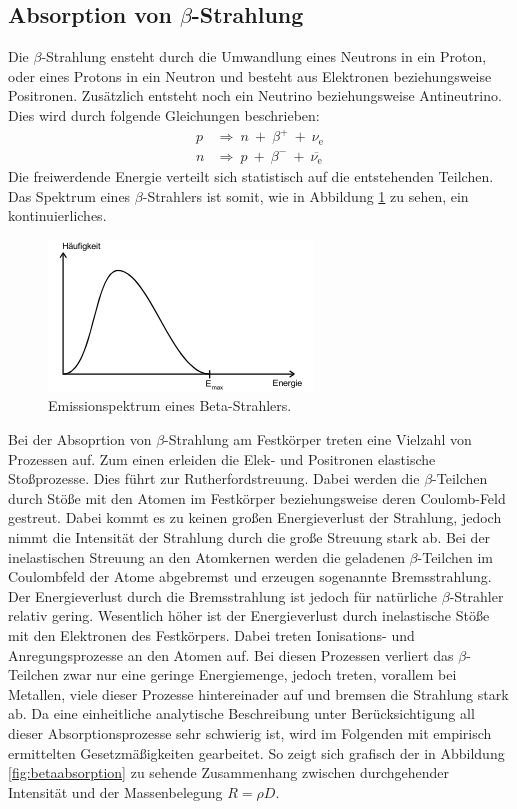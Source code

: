 \subsection{Absorption von \texorpdfstring{$\beta$}{Beta}-Strahlung}
Die $\beta$-Strahlung ensteht durch die Umwandlung eines Neutrons in ein Proton, oder eines Protons in ein Neutron und besteht aus Elektronen beziehungsweise Positronen.
Zusätzlich entsteht noch ein Neutrino beziehungsweise Antineutrino.
Dies wird durch folgende Gleichungen beschrieben:
\begin{align*}
  p & \Rightarrow \: n \: + \: {\beta}^{+} \: + \: \nu_\text{e} \\
  n & \Rightarrow \: p \: + \: {\beta}^{-} \: + \: \overline{\nu_\text{e}}
\end{align*}
Die freiwerdende Energie verteilt sich statistisch auf die entstehenden Teilchen.
Das Spektrum eines $\beta$-Strahlers ist somit, wie in Abbildung \ref{fig:betaspektrum}
zu sehen, ein kontinuierliches.
\begin{figure}
  \centering
  \includegraphics{pictures/betaspektrum.png}
  \caption{Emissionspektrum eines Beta-Strahlers.\cite{sample}}
  \label{fig:betaspektrum}
\end{figure}
Bei der Absoprtion von $\beta$-Strahlung am Festkörper treten eine Vielzahl von Prozessen auf.
Zum einen erleiden die Elek- und Positronen elastische Stoßprozesse. Dies führt zur Rutherfordstreuung.
Dabei werden die $\beta$-Teilchen durch Stöße mit den Atomen im Festkörper beziehungsweise deren Coulomb-Feld gestreut. Dabei kommt es zu keinen großen Energieverlust der Strahlung,
jedoch nimmt die Intensität der Strahlung durch die große Streuung stark ab.
Bei der inelastischen Streuung an den Atomkernen werden die geladenen $\beta$-Teilchen im Coulombfeld der Atome abgebremst und erzeugen sogenannte Bremsstrahlung.
Der Energieverlust durch die Bremsstrahlung ist jedoch für natürliche $\beta$-Strahler relativ gering.
Wesentlich höher ist der Energieverlust durch inelastische Stöße mit den Elektronen des Festkörpers. Dabei treten Ionisations- und Anregungsprozesse an den Atomen auf.
Bei diesen Prozessen verliert das $\beta$-Teilchen zwar nur eine geringe Energiemenge, jedoch treten, vorallem bei Metallen, viele dieser Prozesse hintereinader auf und
bremsen die Strahlung stark ab. Da eine einheitliche analytische Beschreibung unter Berücksichtigung all dieser Absorptionsprozesse sehr schwierig ist, wird im Folgenden
mit empirisch ermittelten Gesetzmäßigkeiten gearbeitet. So zeigt sich grafisch der in Abbildung \ref{fig:betaabsorption} zu sehende Zusammenhang zwischen durchgehender Intensität
und der Massenbelegung $R=\rho D$.

